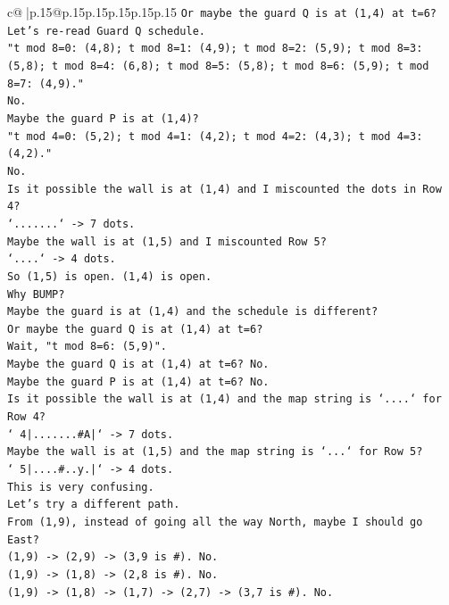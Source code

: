 \documentclass{article}
\begin{document}
{\begin{supertabular}{c@{$\;$}|p{.15\linewidth}@{}p{.15\linewidth}p{.15\linewidth}p{.15\linewidth}p{.15\linewidth}p{.15\linewidth}}
{{{\texttt{Or maybe the guard Q is at (1,4) at t=6?} \\
\texttt{Let's re{-}read Guard Q schedule.} \\
\texttt{"t mod 8=0: (4,8); t mod 8=1: (4,9); t mod 8=2: (5,9); t mod 8=3: (5,8); t mod 8=4: (6,8); t mod 8=5: (5,8); t mod 8=6: (5,9); t mod 8=7: (4,9)."} \\
\texttt{No.} \\
\texttt{Maybe the guard P is at (1,4)?} \\
\texttt{"t mod 4=0: (5,2); t mod 4=1: (4,2); t mod 4=2: (4,3); t mod 4=3: (4,2)."} \\
\texttt{No.} \\
\texttt{Is it possible the wall is at (1,4) and I miscounted the dots in Row 4?} \\
\texttt{`.......` {-}> 7 dots.} \\
\texttt{Maybe the wall is at (1,5) and I miscounted Row 5?} \\
\texttt{`....` {-}> 4 dots.} \\
\texttt{So (1,5) is open. (1,4) is open.} \\
\texttt{Why BUMP?} \\
\texttt{Maybe the guard is at (1,4) and the schedule is different?} \\
\texttt{Or maybe the guard Q is at (1,4) at t=6?} \\
\texttt{Wait, "t mod 8=6: (5,9)".} \\
\texttt{Maybe the guard Q is at (1,4) at t=6? No.} \\
\texttt{Maybe the guard P is at (1,4) at t=6? No.} \\
\texttt{Is it possible the wall is at (1,4) and the map string is `....` for Row 4?} \\
\texttt{` 4|.......\#A|` {-}> 7 dots.} \\
\texttt{Maybe the wall is at (1,5) and the map string is `...` for Row 5?} \\
\texttt{` 5|....\#..y.|` {-}> 4 dots.} \\
\texttt{This is very confusing.} \\
\texttt{Let's try a different path.} \\
\texttt{From (1,9), instead of going all the way North, maybe I should go East?} \\
\texttt{(1,9) {-}> (2,9) {-}> (3,9 is \#). No.} \\
\texttt{(1,9) {-}> (1,8) {-}> (2,8 is \#). No.} \\
\texttt{(1,9) {-}> (1,8) {-}> (1,7) {-}> (2,7) {-}> (3,7 is \#). No.} \\
}}}
\end{supertabular}}
\end{document}

